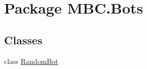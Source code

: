 \hypertarget{namespace_m_b_c_1_1_bots}{\section{Package M\-B\-C.\-Bots}
\label{namespace_m_b_c_1_1_bots}
}
\subsection*{Classes}
\begin{DoxyCompactItemize}
\item 
class \hyperlink{class_m_b_c_1_1_bots_1_1_random_bot}{Random\-Bot}
\end{DoxyCompactItemize}
